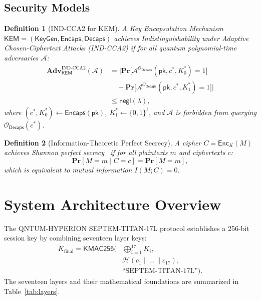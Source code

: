 \documentclass{ieeeaccess}
\renewcommand{\Pr}{\mathbf{Pr}}
\newcommand{\Adv}{\mathbf{Adv}}
\newcommand{\negl}{\mathsf{negl}}
\newcommand{\calA}{\mathcal{A}}
\newcommand{\calO}{\mathcal{O}}
\newtheorem{definition}{Definition}
\begin{document}
\subsection{Security Models}
\begin{definition}[IND-CCA2 for KEM]
A Key Encapsulation Mechanism $\mathsf{KEM} = (\mathsf{KeyGen}, \mathsf{Encaps}, \mathsf{Decaps})$ achieves Indistinguishability under Adaptive Chosen-Ciphertext Attacks (IND-CCA2) if for all quantum polynomial-time adversaries $\calA$:
\begin{equation}
\begin{aligned}
  \Adv_{\mathsf{KEM}}^{\mathrm{IND\text{-}CCA2}}(\calA)
  &= \Big| \Pr\big[\calA^{\calO_{\mathsf{Decaps}}}(\mathsf{pk}, c^*, K_0^*) = 1\big] \\
  &\quad - \Pr\big[\calA^{\calO_{\mathsf{Decaps}}}(\mathsf{pk}, c^*, K_1^*) = 1\big] \Big| \\
  &\leq \negl(\lambda),
\end{aligned}
\end{equation}
where $(c^*, K_0^*) \leftarrow \mathsf{Encaps}(\mathsf{pk})$, $K_1^* \leftarrow \{0,1\}^\ell$, and $\calA$ is forbidden from querying $\calO_{\mathsf{Decaps}}(c^*)$.
\end{definition}

\begin{definition}[Information-Theoretic Perfect Secrecy]
A cipher $C = \mathsf{Enc}_K(M)$ achieves Shannon perfect secrecy~\cite{Shannon1949} if for all plaintexts $m$ and ciphertexts $c$:
\begin{equation}
  \Pr[M = m \mid C = c] = \Pr[M = m],
\end{equation}
which is equivalent to mutual information $I(M; C) = 0$.
\end{definition}

\section{System Architecture Overview}
\label{sec:arch}

The \textsc{QNTUM-HYPERION SEPTEM-TITAN-17L} protocol establishes a 256-bit session key by combining seventeen layer keys:
\begin{equation}
\begin{aligned}
  K_{\mathrm{final}} = \mathsf{KMAC256}\Big(
    &\bigoplus_{i=1}^{17} K_i, \\
    &\mathcal{H}(c_1 \parallel \dots \parallel c_{17}), \\
    &\text{``SEPTEM-TITAN-17L''}\Big).
\end{aligned}
\label{eq:master-key}
\end{equation}
The seventeen layers and their mathematical foundations are summarized in Table~\ref{tab:layers}.
\end{document}
